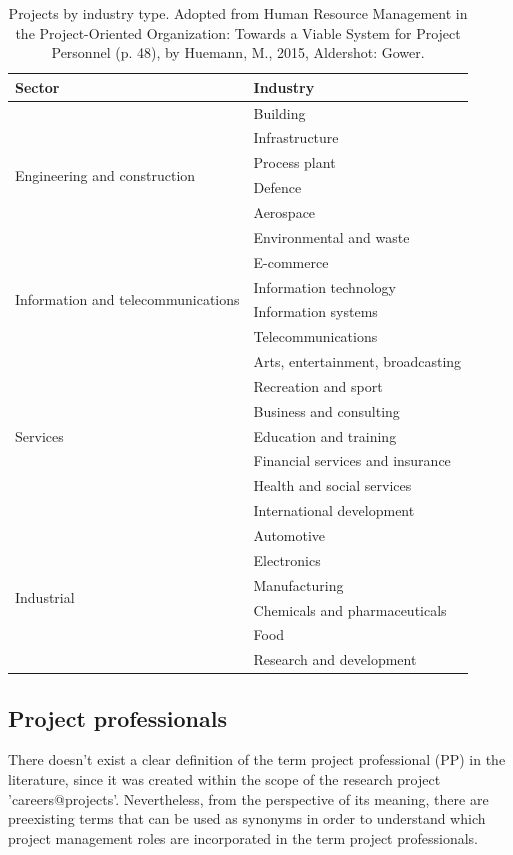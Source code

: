 \begin{table}[!htb]
    \captionsetup{font=small}
    \centering
    \small
    \begin{tabular}{ |l|l| }
    \hline
    {\bf Sector} & {\bf Industry} \\
    \hline
    \multirow{6}{*}{Engineering and construction} & Building \\
     & Infrastructure \\
     & Process plant \\
     & Defence \\
     & Aerospace \\
     & Environmental and waste \\ \hline
    \multirow{4}{*}{Information and telecommunications} & E-commerce \\
     & Information technology \\
     & Information systems \\
     & Telecommunications \\ \hline
    \multirow{7}{*}{Services} & Arts, entertainment, broadcasting \\
     & Recreation and sport \\
     & Business and consulting \\
     & Education and training \\
     & Financial services and insurance \\
     & Health and social services \\
     & International development \\ \hline
    \multirow{6}{*}{Industrial} & Automotive \\
     & Electronics \\
     & Manufacturing \\
     & Chemicals and pharmaceuticals \\
     & Food \\
     & Research and development \\
    \hline
    \end{tabular}
    \caption[Projects by industry type]{Projects by industry type. Adopted from Human Resource Management in the Project-Oriented Organization: Towards a Viable System for Project Personnel (p. 48), by Huemann, M., 2015, Aldershot: Gower.}
    \label{tab:indu}
\end{table}

\clearpage
\subsection{Project professionals}
There doesn't exist a clear definition of the term project professional (PP) in the literature, since it was created within the scope of the research project 'careers@projects'. Nevertheless, from the perspective of its meaning, there are preexisting terms that can be used as synonyms in order to understand which project management roles are incorporated in the term project professionals.

